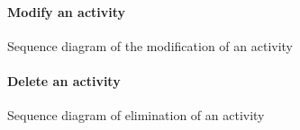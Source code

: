 \documentclass[12pt,titlepage]{article}
\begin{document}
\begin{figure}
\paragraph{Modify an activity}
\centering
{} 
\caption{Sequence diagram of the modification of an activity}
\end{figure}

\begin{figure}
\paragraph{Delete an activity}
\centering
{} 
\caption{Sequence diagram of elimination of an activity}
\end{figure}

\end{document}

